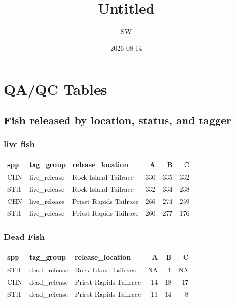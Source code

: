 \documentclass[
]{article}
\title{Untitled}
\author{SW}
\date{2026-08-14}
\begin{document}
\maketitle

\section{QA/QC Tables}\label{qaqc-tables}

\subsection{Fish released by location, status, and
tagger}\label{fish-released-by-location-status-and-tagger}

\subsubsection{live fish}\label{live-fish}

\begin{table}
\centering
\begin{tabular}[t]{l|l|l|r|r|r}
\hline
spp & tag\_group & release\_location & A & B & C\\
\hline
CHN & live\_release & Rock Island Tailrace & 330 & 335 & 332\\
\hline
STH & live\_release & Rock Island Tailrace & 332 & 334 & 238\\
\hline
CHN & live\_release & Priest Rapids Tailrace & 266 & 274 & 259\\
\hline
STH & live\_release & Priest Rapids Tailrace & 260 & 277 & 176\\
\hline
\end{tabular}
\end{table}

\subsubsection{Dead Fish}\label{dead-fish}

\begin{table}
\centering
\begin{tabular}[t]{l|l|l|r|r|r}
\hline
spp & tag\_group & release\_location & A & B & C\\
\hline
STH & dead\_release & Rock Island Tailrace & NA & 1 & NA\\
\hline
CHN & dead\_release & Priest Rapids Tailrace & 14 & 18 & 17\\
\hline
STH & dead\_release & Priest Rapids Tailrace & 11 & 14 & 8\\
\hline
\end{tabular}
\end{table}
\end{document}
